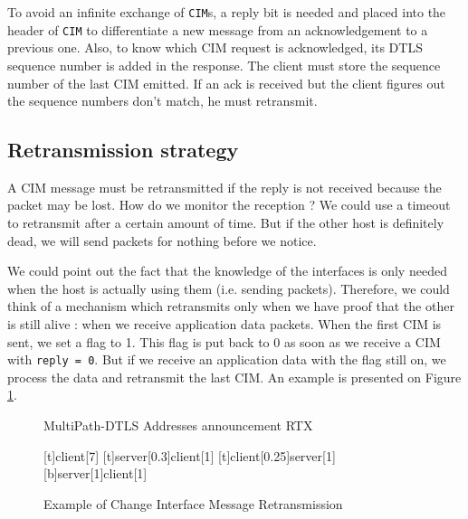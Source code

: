 To avoid an infinite exchange of \texttt{CIM}s, a reply bit is needed and placed into the header of \texttt{CIM} to differentiate a new message from an acknowledgement to a previous one. Also, to know which CIM request is acknowledged, its DTLS sequence number is added in the response. The client must store the sequence number of the last CIM emitted. If an ack is received but the client figures out the sequence numbers don't match, he must retransmit.

\subsection{Retransmission strategy}


A CIM message must be retransmitted if the reply is not received because the packet may be lost. How do we monitor the reception ? We could use a timeout to retransmit after a certain amount of time. But if the other host is definitely dead, we will send packets for nothing before we notice.

We could point out the fact that the knowledge of the interfaces is only needed when the host is actually using them (i.e. sending packets). Therefore, we could think of a mechanism which retransmits only when we have proof that the other is still alive : when we receive application data packets. When the first CIM is sent, we set a flag to 1. This flag is put back to 0 as soon as we receive a CIM with \verb$reply = 0$. But if we receive an application data with the flag still on, we process the data and retransmit the last CIM. An example is presented on Figure \ref{fig:CIMexchange2}.

\begin{figure}[!h]
\centering
\begin{msc}[r]{MultiPath-DTLS Addresses announcement RTX}

\setlength{\instfootheight}{0em}
\setlength{\instheadheight}{0em}
\setlength{\instdist}{0.7\linewidth}
\setlength{\levelheight}{3em}


[t]{}{client}[7]
\nextlevel
{}[t]{server}[0.3]{client}[1]
\nextlevel
{}[t]{client}[0.25]{server}[1]
\nextlevel
{}[b]{server}[1]{client}[1]
\nextlevel
\nextlevel

\end{msc}
\caption{Example of Change Interface Message Retransmission}
\label{fig:CIMexchange2}
\end{figure}

